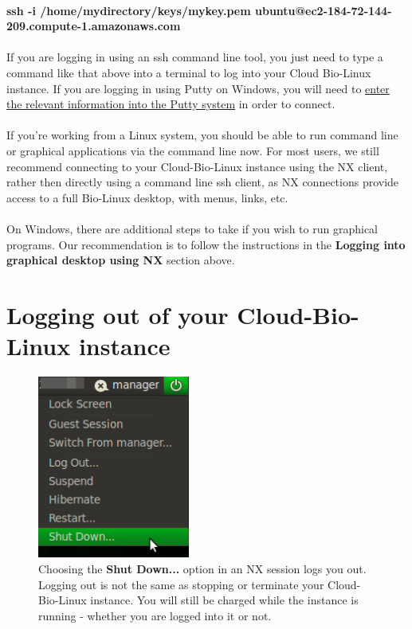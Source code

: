 \paragraph{ssh -i /home/mydirectory/keys/mykey.pem ubuntu@ec2-184-72-144-209.compute-1.amazonaws.com}

\paragraph{}If you are logging in using an ssh command line tool, you just need to type a command like that above into a terminal to log into your Cloud Bio-Linux instance. If you are logging in using Putty on Windows, you will need to \href{http://www.ualberta.ca/CNS/RESEARCH/LinuxClusters/pka-putty.html}{enter the relevant information into the Putty system} in order to connect.

\paragraph{}If you're working from a Linux system, you should be able to run command line or graphical applications via the command line now. For most users, we still recommend connecting to your Cloud-Bio-Linux instance using the NX client, rather then directly using a command line ssh client, as NX connections provide access to a full Bio-Linux desktop, with menus, links, etc. 

\paragraph{}On Windows, there are additional steps to take if you wish to run graphical programs. Our recommendation is to follow the instructions in the  \textbf{Logging into graphical desktop using NX} section above.


\section{Logging out of your Cloud-Bio-Linux instance}

\begin{figure}
\includegraphics[width=50mm]{"images/nxshutdown"}
\caption[Logging out of NX]{\label{fig:nxshutdown}Choosing the \textbf{Shut Down...} option in an NX session logs you out. Logging out is not the same as stopping or terminate your Cloud-Bio-Linux instance. You will still be charged while the instance is running - whether you are logged into it or not.}
\end{figure}

